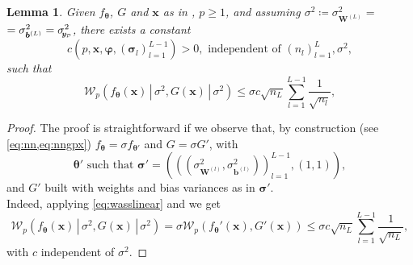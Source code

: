 \documentclass[a4paper, 11pt, reqno]{amsart}
\theoremstyle{plain}
\newtheorem{lemma}[theorem]{Lemma}
\theoremstyle{remark}
\theoremstyle{definition}
\newcommand{\given}{\, | \,}
\newcommand{\wass}[3][2]{\mathcal{W}_{#1}\left(#2, #3\right)}
\newcommand{\sigmay}{\sigma_{\scalebox{0.65}{$\kern-3pt\bm{y}_{\mathcal{D}}$}}}%
\begin{document}
\begin{lemma} \label{lem:priornngpsigma}
	Given $f_{\bm{\theta}}$, $G$ and $\bm{x}$ as in , $p \geq 1$, and assuming $\sigma^2 \coloneqq \sigma_{\bm{W}^{(L)}}^2 =$ $= \sigma_{\bm{b}^{(L)}}^2 = \sigmay^2$, there exists a constant
	\begin{equation*}
		c\left(p, \bm{x}, \bm{\varphi}, (\bm{\sigma}_l)_{l = 1}^{L - 1}\right) > 0, \text{ independent of } \left(n_l\right)_{l = 1}^L, \sigma^2,
	\end{equation*}
	such that
	\begin{equation*}
		\wass[p]{f_{\bm{\theta}}(\bm{x}) \given \sigma^2}{G(\bm{x}) \given \sigma^2} \leq \sigma c \sqrt{n_L} \sum_{l = 1}^{L - 1} \frac{1}{\sqrt{n_l}},
	\end{equation*}
\end{lemma}
\begin{proof}
	The proof is straightforward if we observe that, by construction (see \cref{eq:nn,eq:nngpx}) $f_{\bm{\theta}} = \sigma f_{\bm{\theta}'}$ and $G = \sigma  G'$, with 
	\begin{equation} \label{eq:thetaprime}
		\bm{\theta}' \text{ such that } \bm{\sigma}' = \left(\left(\left(\sigma_{\bm{W}^{(l)}}^2, \sigma_{\bm{b}^{(l)}}^2\right)\right)_{l = 1}^{L - 1}, (1, 1)\right),
	\end{equation}
	and $G'$ built with weights and bias variances as in $\bm{\sigma}'$. \\
	Indeed, applying \cref{eq:wasslinear} and  we get
	\begin{equation*}
		\wass[p]{f_{\bm{\theta}}(\bm{x}) \given \sigma^2}{G(\bm{x}) \given \sigma^2} =\sigma \wass[p]{f_{\bm{\theta}}'(\bm{x})}{G'(\bm{x})} \leq \sigma c \sqrt{n_L} \sum_{l = 1}^{L - 1} \frac{1}{\sqrt{n_L}}, 
	\end{equation*}
	with $c$ independent of $\sigma^2$.
\end{proof}
\end{document}
